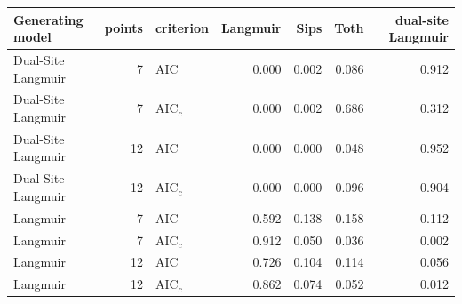 \begin{tabular}{lrlrrrr}
\toprule
Generating model & points & criterion & Langmuir & Sips & Toth & dual-site Langmuir \\
\midrule
Dual-Site Langmuir & 7 & AIC & 0.000 & 0.002 & 0.086 & 0.912 \\
Dual-Site Langmuir & 7 & AIC$_c$ & 0.000 & 0.002 & 0.686 & 0.312 \\
Dual-Site Langmuir & 12 & AIC & 0.000 & 0.000 & 0.048 & 0.952 \\
Dual-Site Langmuir & 12 & AIC$_c$ & 0.000 & 0.000 & 0.096 & 0.904 \\
Langmuir & 7 & AIC & 0.592 & 0.138 & 0.158 & 0.112 \\
Langmuir & 7 & AIC$_c$ & 0.912 & 0.050 & 0.036 & 0.002 \\
Langmuir & 12 & AIC & 0.726 & 0.104 & 0.114 & 0.056 \\
Langmuir & 12 & AIC$_c$ & 0.862 & 0.074 & 0.052 & 0.012 \\
\bottomrule
\end{tabular}
